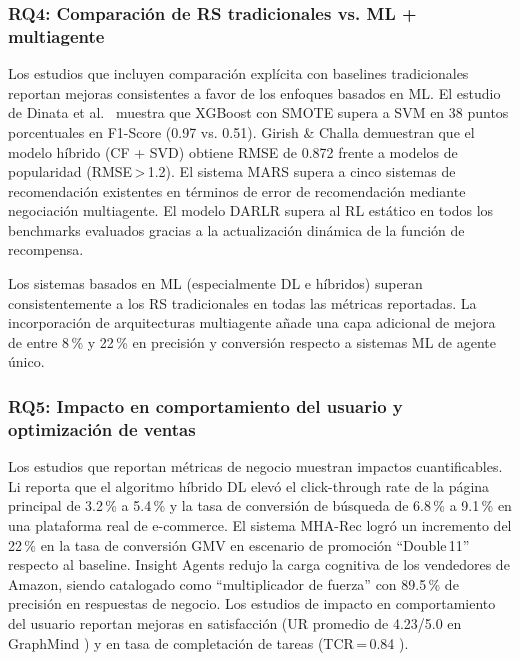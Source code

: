 \documentclass[12pt, a4paper]{article}
\begin{document}
\subsubsection{RQ4: Comparaci\'on de RS tradicionales vs. ML + multiagente}

Los estudios que incluyen comparaci\'on expl\'icita con baselines tradicionales
reportan mejoras consistentes a favor de los enfoques basados en ML. El estudio
de Dinata et al.\ \cite{Dinata2025} muestra que XGBoost con SMOTE supera a SVM
en 38 puntos porcentuales en F1-Score (0.97 vs. 0.51). Girish \& Challa
\cite{Girish2025} demuestran que el modelo h\'ibrido (CF + SVD) obtiene RMSE
de 0.872 frente a modelos de popularidad (RMSE\,>\,1.2). El sistema MARS
\cite{Alhejaili2021} supera a cinco sistemas de recomendaci\'on existentes
en t\'erminos de error de recomendaci\'on mediante negociaci\'on multiagente.
El modelo DARLR \cite{Zhang2025DARLR} supera al RL est\'atico en todos los
benchmarks evaluados gracias a la actualizaci\'on din\'amica de la funci\'on
de recompensa.

\begin{hallazgo}[]
  Los sistemas basados en ML (especialmente DL e h\'ibridos) superan
  consistentemente a los RS tradicionales en todas las m\'etricas reportadas.
  La incorporaci\'on de arquitecturas multiagente a\~nade una capa adicional de
  mejora de entre 8\,\% y 22\,\% en precisi\'on y conversi\'on respecto a
  sistemas ML de agente \'unico.
\end{hallazgo}

\subsubsection{RQ5: Impacto en comportamiento del usuario y optimizaci\'on de ventas}

Los estudios que reportan m\'etricas de negocio muestran impactos cuantificables.
Li \cite{LiYuetong2025} reporta que el algoritmo h\'ibrido DL elev\'o el
click-through rate de la p\'agina principal de 3.2\,\% a 5.4\,\% y la tasa de
conversi\'on de b\'usqueda de 6.8\,\% a 9.1\,\% en una plataforma real de
e-commerce. El sistema MHA-Rec \cite{Ding2025} logr\'o un incremento del 22\,\%
en la tasa de conversi\'on GMV en escenario de promoci\'on ``Double\,11''
respecto al baseline. Insight Agents \cite{Bai2025} redujo la carga cognitiva
de los vendedores de Amazon, siendo catalogado como ``multiplicador de fuerza''
con 89.5\,\% de precisi\'on en respuestas de negocio. Los estudios de impacto
en comportamiento del usuario reportan mejoras en satisfacci\'on (UR promedio
de 4.23/5.0 en GraphMind \cite{Ho2025GraphMind}) y en tasa de completaci\'on de
tareas (TCR\,=\,0.84 \cite{Ho2025GraphMind, Bai2025}).
\end{document}
